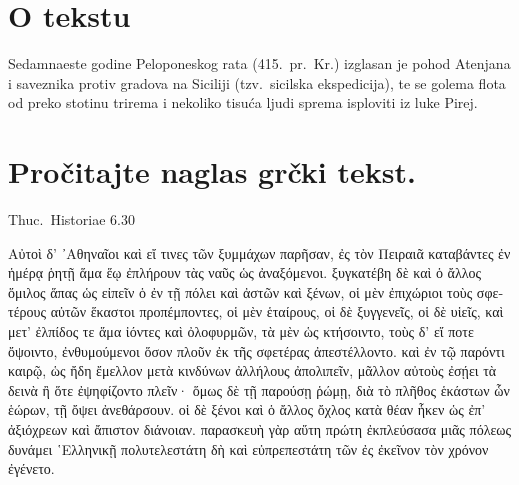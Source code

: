 


\section*{O tekstu}

Sedamnaeste godine Peloponeskog rata (415.\ pr.\ Kr.) izglasan je pohod Atenjana i saveznika protiv gradova na Siciliji (tzv.\ sicilska ekspedicija), te se golema flota od preko stotinu trirema i nekoliko tisuća ljudi sprema isploviti iz luke Pirej.


\section*{Pročitajte naglas grčki tekst.}


Thuc.\ Historiae 6.30

\medskip

{\large
\begin{greek}
\noindent Αὐτοὶ δ' ᾿Αθηναῖοι καὶ εἴ τινες τῶν ξυμμάχων παρῆσαν, ἐς τὸν Πειραιᾶ καταβάντες ἐν ἡμέρᾳ ῥητῇ ἅμα ἕῳ ἐπλήρουν τὰς ναῦς ὡς ἀναξόμενοι. ξυγκατέβη δὲ καὶ ὁ ἄλλος ὅμιλος ἅπας ὡς εἰπεῖν ὁ ἐν τῇ πόλει καὶ ἀστῶν καὶ ξένων, οἱ μὲν ἐπιχώριοι τοὺς σφετέρους αὐτῶν ἕκαστοι προπέμποντες, οἱ μὲν ἑταίρους, οἱ δὲ ξυγγενεῖς, οἱ δὲ υἱεῖς, καὶ μετ' ἐλπίδος τε ἅμα ἰόντες καὶ ὀλοφυρμῶν, τὰ μὲν ὡς κτήσοιντο, τοὺς δ' εἴ ποτε ὄψοιντο, ἐνθυμούμενοι ὅσον πλοῦν ἐκ τῆς σφετέρας ἀπεστέλλοντο. καὶ ἐν τῷ παρόντι καιρῷ, ὡς ἤδη ἔμελλον μετὰ κινδύνων ἀλλήλους ἀπολιπεῖν, μᾶλλον αὐτοὺς ἐσῄει τὰ δεινὰ ἢ ὅτε ἐψηφίζοντο πλεῖν· ὅμως δὲ τῇ παρούσῃ ῥώμῃ, διὰ τὸ πλῆθος ἑκάστων ὧν ἑώρων, τῇ ὄψει ἀνεθάρσουν. οἱ δὲ ξένοι καὶ ὁ ἄλλος ὄχλος κατὰ θέαν ἧκεν ὡς ἐπ' ἀξιόχρεων καὶ ἄπιστον διάνοιαν. παρασκευὴ γὰρ αὕτη πρώτη ἐκπλεύσασα μιᾶς πόλεως δυνάμει ῾Ελληνικῇ πολυτελεστάτη δὴ καὶ εὐπρεπεστάτη τῶν ἐς ἐκεῖνον τὸν χρόνον ἐγένετο.

\end{greek}

}


